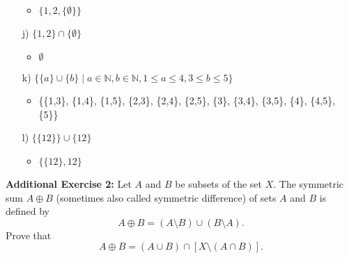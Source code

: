 \documentclass[11pt]{article}
\begin{document}
\begin{enumerate}
\begin{itemize}
    \item $\{1, 2, \{\emptyset\}\}$
\end{itemize}
\item[j)] $\{1,2\}\cap\{\emptyset\}$
\begin{itemize}
    \item $\emptyset$
\end{itemize}
\item[k)] $\{\{a\}\cup\{b\}\mid a \in \mathds{N}, b \in \mathds{N}, 1 \leq a \leq 4, 3 \leq b \leq 5\}$
\begin{itemize}
    \item \{\{1,3\}, \{1,4\}, \{1,5\}, \{2,3\}, \{2,4\}, \{2,5\}, \{3\}, \{3,4\}, \{3,5\}, \{4\}, \{4,5\}, \{5\}\}
\end{itemize}
\item[l)] $\{\{12\} \} \cup \{12\}$
\begin{itemize}
    \item $\{\{12\}, 12 \}$
\end{itemize}
\end{enumerate} 
\textbf{Additional Exercise 2:} Let $A$ and $B$ be subsets of the set $X.$
The symmetric sum $A\oplus B$ (sometimes also called symmetric difference) of sets $A$ and $B$ is defined by
$$A\oplus B=(A\setminus B)\cup (B\setminus A).$$
Prove that
$$A\oplus B=(A\cup B)\cap [X\setminus(A\cap B)].$$
\end{document}
